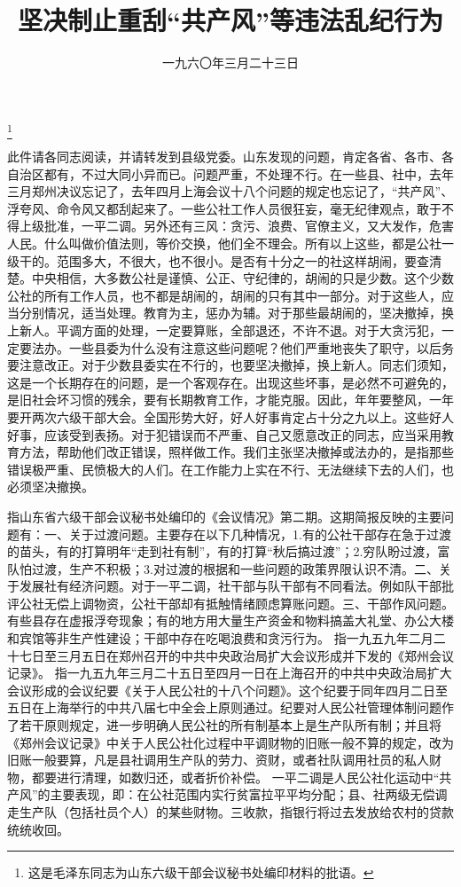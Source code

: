 
\title{坚决制止重刮“共产风”等违法乱纪行为}
\date{一九六〇年三月二十三日}
\thanks{这是毛泽东同志为山东六级干部会议秘书处编印材料的批语。}
\maketitle



此件请各同志阅读，并请转发到县级党委。山东发现的问题，肯定各省、各市、各自治区都有，不过大同小异而已。问题严重，不处理不行。在一些县、社中，去年三月郑州决议忘记了，去年四月上海会议十八个问题的规定也忘记了，“共产风”、浮夸风、命令风又都刮起来了。一些公社工作人员很狂妄，毫无纪律观点，敢于不得上级批准，一平二调。另外还有三风：贪污、浪费、官僚主义，又大发作，危害人民。什么叫做价值法则，等价交换，他们全不理会。所有以上这些，都是公社一级干的。范围多大，不很大，也不很小。是否有十分之一的社这样胡闹，要查清楚。中央相信，大多数公社是谨慎、公正、守纪律的，胡闹的只是少数。这个少数公社的所有工作人员，也不都是胡闹的，胡闹的只有其中一部分。对于这些人，应当分别情况，适当处理。教育为主，惩办为辅。对于那些最胡闹的，坚决撤掉，换上新人。平调方面的处理，一定要算账，全部退还，不许不退。对于大贪污犯，一定要法办。一些县委为什么没有注意这些问题呢？他们严重地丧失了职守，以后务要注意改正。对于少数县委实在不行的，也要坚决撤掉，换上新人。同志们须知，这是一个长期存在的问题，是一个客观存在。出现这些坏事，是必然不可避免的，是旧社会坏习惯的残余，要有长期教育工作，才能克服。因此，年年要整风，一年要开两次六级干部大会。全国形势大好，好人好事肯定占十分之九以上。这些好人好事，应该受到表扬。对于犯错误而不严重、自己又愿意改正的同志，应当采用教育方法，帮助他们改正错误，照样做工作。我们主张坚决撤掉或法办的，是指那些错误极严重、民愤极大的人们。在工作能力上实在不行、无法继续下去的人们，也必须坚决撤换。

\begin{maonote}
指山东省六级干部会议秘书处编印的《会议情况》第二期。这期简报反映的主要问题有：一、关于过渡问题。主要存在以下几种情况，1.有的公社干部存在急于过渡的苗头，有的打算明年“走到社有制”，有的打算“秋后搞过渡”；2.穷队盼过渡，富队怕过渡，生产不积极；3.对过渡的根据和一些问题的政策界限认识不清。二、关于发展社有经济问题。对于一平二调，社干部与队干部有不同看法。例如队干部批评公社无偿上调物资，公社干部却有抵触情绪顾虑算账问题。三、干部作风问题。有些县存在虚报浮夸现象；有的地方用大量生产资金和物料搞盖大礼堂、办公大楼和宾馆等非生产性建设；干部中存在吃喝浪费和贪污行为。
指一九五九年二月二十七日至三月五日在郑州召开的中共中央政治局扩大会议形成并下发的《郑州会议记录》。
指一九五九年三月二十五日至四月一日在上海召开的中共中央政治局扩大会议形成的会议纪要《关于人民公社的十八个问题》。这个纪要于同年四月二日至五日在上海举行的中共八届七中全会上原则通过。纪要对人民公社管理体制问题作了若干原则规定，进一步明确人民公社的所有制基本上是生产队所有制；并且将《郑州会议记录》中关于人民公社化过程中平调财物的旧账一般不算的规定，改为旧账一般要算，凡是县社调用生产队的劳力、资财，或者社队调用社员的私人财物，都要进行清理，如数归还，或者折价补偿。
一平二调是人民公社化运动中“共产风”的主要表现，即：在公社范围内实行贫富拉平平均分配；县、社两级无偿调走生产队（包括社员个人）的某些财物。三收款，指银行将过去发放给农村的贷款统统收回。
\end{maonote}
